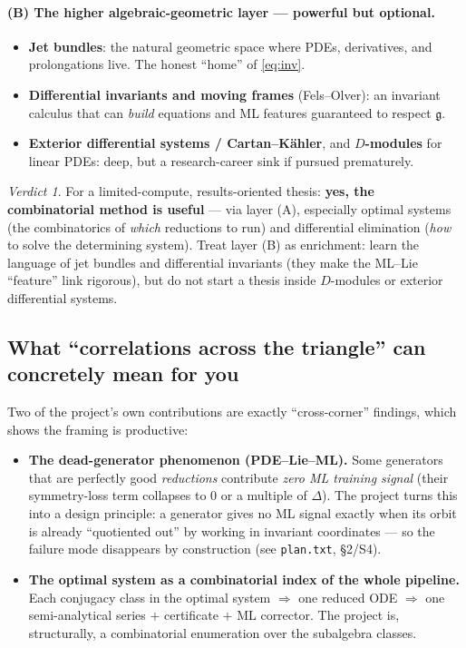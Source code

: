 \documentclass[11pt]{article}
\theoremstyle{definition}
\theoremstyle{remark}
\newtheorem*{verdict}{Verdict}
\newcommand{\g}{\mathfrak{g}}
\begin{document}
\paragraph{(B) The higher algebraic-geometric layer --- powerful but optional.}
\begin{itemize}[nosep]
  \item \textbf{Jet bundles}: the natural geometric space where PDEs, derivatives, and prolongations
        live. The honest ``home'' of \eqref{eq:inv}.
  \item \textbf{Differential invariants and moving frames} (Fels--Olver): an invariant calculus that can
        \emph{build} equations and ML features guaranteed to respect $\g$.
  \item \textbf{Exterior differential systems / Cartan--K\"ahler}, and \textbf{$D$-modules} for linear
        PDEs: deep, but a research-career sink if pursued prematurely.
\end{itemize}

\begin{verdict}
For a limited-compute, results-oriented thesis: \textbf{yes, the combinatorial method is useful} --- via
layer (A), especially optimal systems (the combinatorics of \emph{which} reductions to run) and
differential elimination (\emph{how} to solve the determining system). Treat layer (B) as enrichment:
learn the language of jet bundles and differential invariants (they make the ML--Lie ``feature'' link
rigorous), but do not start a thesis inside $D$-modules or exterior differential systems.
\end{verdict}

\subsection{What ``correlations across the triangle'' can concretely mean for you}

Two of the project's own contributions are exactly ``cross-corner'' findings, which shows the framing is
productive:
\begin{itemize}[nosep]
  \item \textbf{The dead-generator phenomenon (PDE--Lie--ML).} Some generators that are perfectly good
        \emph{reductions} contribute \emph{zero ML training signal} (their symmetry-loss term collapses to
        $0$ or a multiple of $\Delta$). The project turns this into a design principle: a generator gives
        no ML signal exactly when its orbit is already ``quotiented out'' by working in invariant
        coordinates --- so the failure mode disappears by construction (see \texttt{plan.txt}, \S2/S4).
  \item \textbf{The optimal system as a combinatorial index of the whole pipeline.} Each conjugacy class
        in the optimal system $\Rightarrow$ one reduced ODE $\Rightarrow$ one semi-analytical series $+$
        certificate $+$ ML corrector. The project is, structurally, a combinatorial enumeration over the
        subalgebra classes.
\end{itemize}
\end{document}
